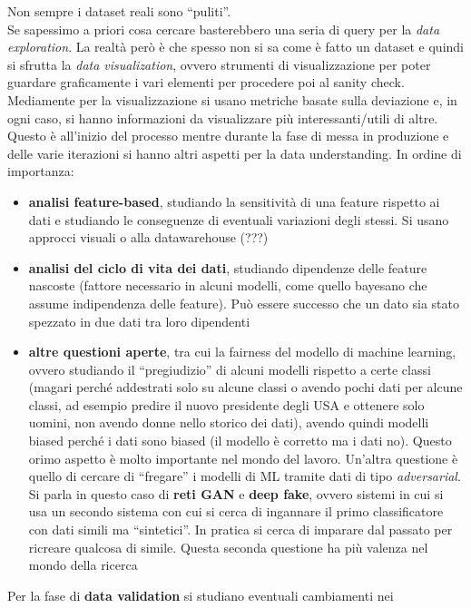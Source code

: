 \documentclass[a4paper,12pt, oneside]{book}
\begin{document}
Non sempre i dataset reali sono ``puliti''.\\
Se sapessimo a priori cosa cercare basterebbero una seria di query per la
\textit{data exploration}. La realtà però è che spesso non si sa come è fatto un
dataset e quindi si sfrutta la \textit{data visualization}, ovvero strumenti di
visualizzazione per poter guardare graficamente i vari elementi per procedere
poi al sanity check. Mediamente per la visualizzazione si usano metriche basate
sulla deviazione e, in ogni caso, si hanno informazioni da visualizzare più
interessanti/utili di altre.\\
Questo è all'inizio del processo mentre durante la
fase di messa in produzione e delle varie iterazioni si hanno altri aspetti per
la data understanding. In ordine di importanza:
\begin{itemize}
  \item \textbf{analisi feature-based}, studiando la sensitività di una feature
  rispetto ai dati e studiando le conseguenze di eventuali variazioni degli
  stessi. Si usano approcci visuali o alla datawarehouse (???)
  \item \textbf{analisi del ciclo di vita dei dati}, studiando dipendenze delle
  feature nascoste (fattore necessario in alcuni modelli, come quello bayesano
  che assume indipendenza delle feature). Può essere successo che un dato sia
  stato spezzato in due dati tra loro dipendenti 
  \item \textbf{altre questioni aperte}, tra cui la fairness del modello di
  machine learning, ovvero studiando il ``pregiudizio'' di alcuni modelli
  rispetto a certe classi (magari perché addestrati solo su alcune classi o
  avendo pochi dati per alcune classi, ad esempio predire il nuovo presidente
  degli USA e ottenere solo uomini, non avendo donne nello storico dei dati),
  avendo quindi modelli biased perché i dati sono biased (il modello è corretto
  ma i dati no). Questo orimo aspetto è molto importante nel mondo del
  lavoro. Un'altra questione è quello di cercare di ``fregare'' i modelli 
  di ML tramite dati di tipo \textit{adversarial}. Si parla in questo caso di
  \textbf{reti GAN} e \textbf{deep fake}, ovvero sistemi in cui si usa un
  secondo sistema con cui si cerca di ingannare il primo classificatore con dati
  simili ma ``sintetici''. In pratica si cerca di imparare dal passato per
  ricreare qualcosa di simile. Questa seconda questione ha più valenza nel mondo
  della ricerca
\end{itemize}
Per la fase di \textbf{data validation} si studiano eventuali cambiamenti nei
\end{document}
